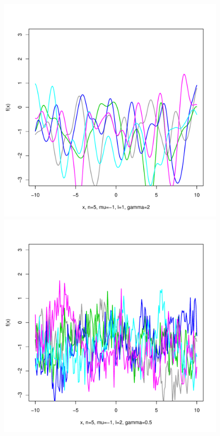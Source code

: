 \documentclass[12pt,letterpaper]{article}
\begin{document}
\begin{figure}
\begin{center}
\includegraphics[scale=0.2]{hw321/n5-m-1-l1-g4.pdf}
\includegraphics[scale=0.2]{hw321/n5-m-1-l2-g1.pdf}

\end{center}
\end{figure}
\end{document}
